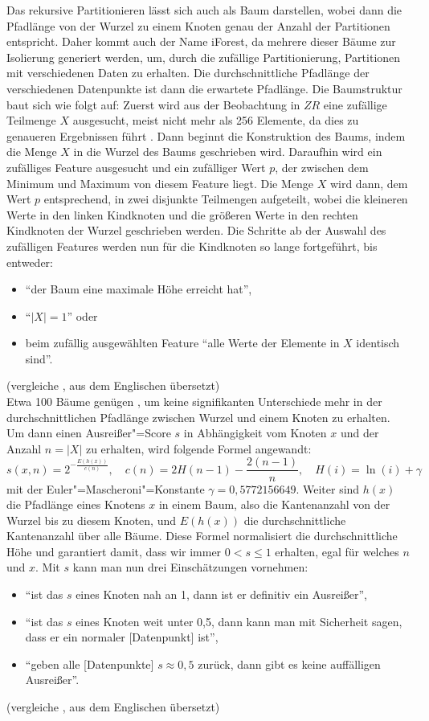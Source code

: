 Das rekursive Partitionieren lässt sich auch als Baum darstellen, wobei dann die Pfadlänge von der Wurzel zu einem Knoten genau der Anzahl der Partitionen entspricht. Daher kommt auch der Name iForest, da mehrere dieser Bäume zur Isolierung generiert werden, um, durch die zufällige Partitionierung, Partitionen mit verschiedenen Daten zu erhalten. Die durchschnittliche Pfadlänge der verschiedenen Datenpunkte ist dann die erwartete Pfadlänge. Die Baumstruktur baut sich wie folgt auf: Zuerst wird aus der Beobachtung in $ZR$ eine zufällige Teilmenge $X$ ausgesucht, meist nicht mehr als 256 Elemente, da dies zu genaueren Ergebnissen führt \cite[Ch. 4.1]{iForest}. Dann beginnt die Konstruktion des Baums, indem die Menge $X$ in die Wurzel des Baums geschrieben wird. Daraufhin wird ein zufälliges Feature ausgesucht und ein zufälliger Wert $p$, der zwischen dem Minimum und Maximum von diesem Feature liegt. Die Menge $X$ wird dann, dem Wert $p$ entsprechend, in zwei disjunkte Teilmengen aufgeteilt, wobei die kleineren Werte in den linken Kindknoten und die größeren Werte in den rechten Kindknoten der Wurzel geschrieben werden. Die Schritte ab der Auswahl des zufälligen Features werden nun für die Kindknoten so lange fortgeführt, bis entweder:
\begin{itemize}
    \item "`der Baum eine maximale Höhe erreicht hat"',
    \item "`$|X|=1$"' oder
    \item beim zufällig ausgewählten Feature "`alle Werte der Elemente in $X$  identisch sind"'.
\end{itemize}
(vergleiche \cite[Ch. 2]{iForest}, aus dem Englischen übersetzt) \\
Etwa 100 Bäume genügen \cite[Ch. 4.1]{iForest}, um keine signifikanten Unterschiede mehr in der durchschnittlichen Pfadlänge zwischen Wurzel und einem Knoten zu erhalten. Um dann einen Ausreißer"=Score $s$ in Abhängigkeit vom Knoten $x$ und der Anzahl $n = |X|$ zu erhalten, wird folgende Formel angewandt:
\[ s(x,n)=2^{-\frac{E(h(x))}{c(n)}} ,\quad c(n) = 2 H(n-1) - \frac{2(n-1)}{n} ,\quad H(i) = \ln(i) + \gamma \]
mit der Euler"=Mascheroni"=Konstante $\gamma=0{,}5772156649$. Weiter sind $h(x)$ die Pfadlänge eines Knotens $x$ in einem Baum, also die Kantenanzahl von der Wurzel bis zu diesem Knoten, und $E(h(x))$ die durchschnittliche Kantenanzahl über alle Bäume. Diese Formel normalisiert die durchschnittliche Höhe und garantiert damit, dass wir immer $0 < s \le 1$ erhalten, egal für welches $n$ und $x$. Mit $s$ kann man nun drei Einschätzungen vornehmen:
\begin{itemize}
    \item "`ist das $s$ eines Knoten nah an 1, dann ist er definitiv ein Ausreißer"',
    \item "`ist das $s$ eines Knoten weit unter 0,5, dann kann man mit Sicherheit sagen, dass er ein normaler [Datenpunkt] ist"',
    \item "`geben alle [Datenpunkte] $s \approx 0{,}5$ zurück, dann gibt es keine auffälligen Ausreißer"'.
\end{itemize}
(vergleiche \cite[Ch. 2]{iForest}, aus dem Englischen übersetzt)

